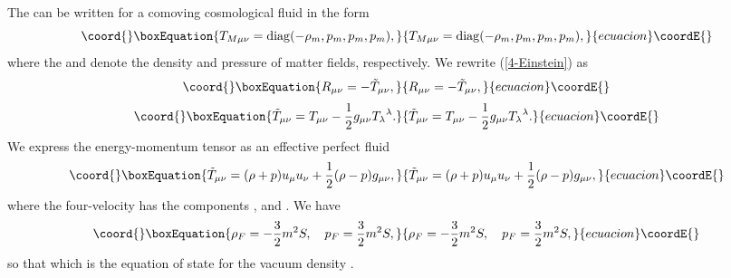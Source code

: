 \documentclass[a4paper,12pt]{article}
\begin{document}
The \coordHE{} can be written for a comoving cosmological
fluid in the form
\begin{equation}\coord{}\boxEquation{
T_{M\mu\nu}={\rm diag}(-\rho_m, p_m, p_m, p_m),
}{
T_{M\mu\nu}={\rm diag}(-\rho_m, p_m, p_m, p_m),
}{ecuacion}\coordE{}\end{equation}
where the \coordHE{} and \coordHE{} denote the density and pressure of matter fields,
respectively. We rewrite (\ref{4-Einstein}) as
\begin{equation}\coord{}\boxEquation{
R_{\mu\nu}=-{\tilde T}_{\mu\nu},
}{
R_{\mu\nu}=-{\tilde T}_{\mu\nu},
}{ecuacion}\coordE{}\end{equation}
\begin{equation}\coord{}\boxEquation{
{\tilde
T}_{\mu\nu}=T_{\mu\nu}-\frac{1}{2}g_{\mu\nu}{T_\lambda}^\lambda.
}{
{\tilde
T}_{\mu\nu}=T_{\mu\nu}-\frac{1}{2}g_{\mu\nu}{T_\lambda}^\lambda.
}{ecuacion}\coordE{}\end{equation} We express the energy-momentum tensor \coordHE{} as an effective perfect fluid
\begin{equation}\coord{}\boxEquation{
{\tilde T}_{\mu\nu}=(\rho+p)u_\mu
u_\nu+\frac{1}{2}(\rho-p)g_{\mu\nu},
}{
{\tilde T}_{\mu\nu}=(\rho+p)u_\mu
u_\nu+\frac{1}{2}(\rho-p)g_{\mu\nu},
}{ecuacion}\coordE{}\end{equation}
where the
four-velocity has the components \coordHE{}, \coordHE{} and
\coordHE{}. We have
\begin{equation}\coord{}\boxEquation{
\rho_F=-\frac{3}{2}m^2S,\quad p_F=\frac{3}{2}m^2S,
}{
\rho_F=-\frac{3}{2}m^2S,\quad p_F=\frac{3}{2}m^2S,
}{ecuacion}\coordE{}\end{equation}
so that \coordHE{} which is the equation of state for the vacuum density
\coordHE{}.
\end{document}
